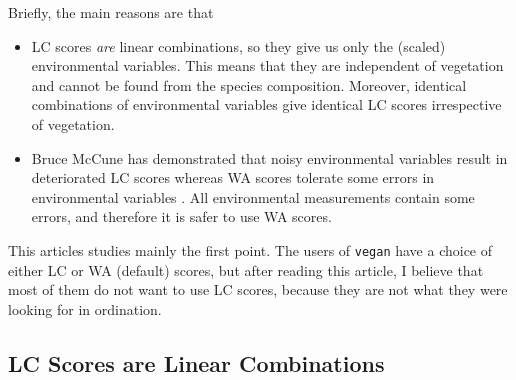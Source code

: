\documentclass[a4paper]{article}
\begin{document}
Briefly, the main reasons are that 
\begin{itemize}
\item
LC scores \emph{are} linear combinations, so they give us only the
(scaled) environmental variables. This means that they are
independent of vegetation and cannot be found from the species
composition.  Moreover, identical combinations of environmental
variables give identical LC scores irrespective of vegetation.
\item
Bruce McCune has demonstrated that noisy environmental variables
result in deteriorated LC scores whereas WA scores tolerate some errors
in environmental variables \cite{McCune97}.  All environmental
measurements contain some errors, and therefore it is safer to use WA
scores. 
\end{itemize}
This articles studies mainly the first point.  The users of
\texttt{vegan} have a choice of either LC or WA (default) scores, but
after reading this article, I believe that most of them do not want to
use LC scores, because they are not what they were looking for in
ordination. 

\subsection{LC Scores are Linear Combinations}
\end{document}
